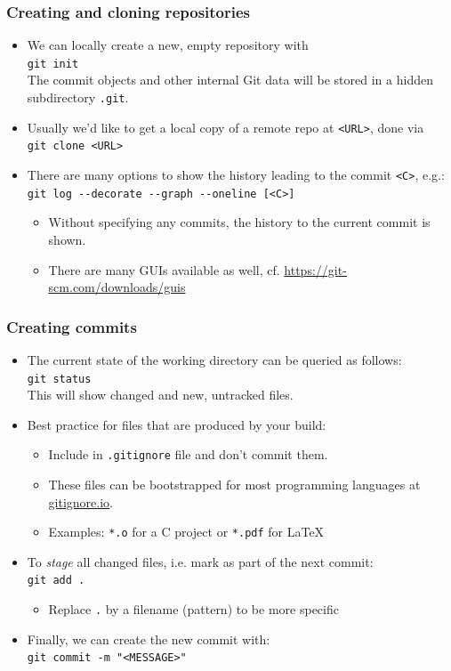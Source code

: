 \documentclass[compress,aspectratio=169]{beamer}
\newcommand{\console}[1]{
  \colorbox{bgcolor}{\texttt{#1}}
}
\begin{document}
\begin{frame}
  \frametitle{Creating and cloning repositories}
  \begin{itemize}
    \item We can locally create a new, empty repository with\\\console{git init}\\The commit objects and other internal Git data will be stored in a hidden subdirectory \texttt{.git}.
    \item Usually we'd like to get a local copy of a remote repo at \texttt{<URL>}, done via\\\console{git clone <URL>}
    \item There are many options to show the history leading to the commit \texttt{<C>}, e.g.:\\\console{git log -\phantom{}-decorate -\phantom{}-graph -\phantom{}-oneline [<C>]}
      \begin{itemize}
        \item Without specifying any commits, the history to the current commit is shown.
        \item There are many GUIs available as well, cf. \url{https://git-scm.com/downloads/guis}
      \end{itemize}
  \end{itemize}
\end{frame}

\begin{frame}
  \frametitle{Creating commits}
  \begin{itemize}
    \item The current state of the working directory can be queried as follows:\\\console{git status}\\This will show changed and new, untracked files.
    \item Best practice for files that are produced by your build:
      \begin{itemize}
        \item Include in \texttt{.gitignore} file and don't commit them.
        \item These files can be bootstrapped for most programming languages at \url{gitignore.io}.
        \item Examples: \texttt{*.o} for a C project or \texttt{*.pdf} for \LaTeX
      \end{itemize}
    \item To \textit{stage} all changed files, i.e. mark as part of the next commit:\\\console{git add .}
      \begin{itemize}
        \item Replace \console{.} by a filename (pattern) to be more specific
      \end{itemize}
    \item Finally, we can create the new commit with:\\\console{git commit -m "<MESSAGE>"}
  \end{itemize}
\end{frame}
\end{document}
